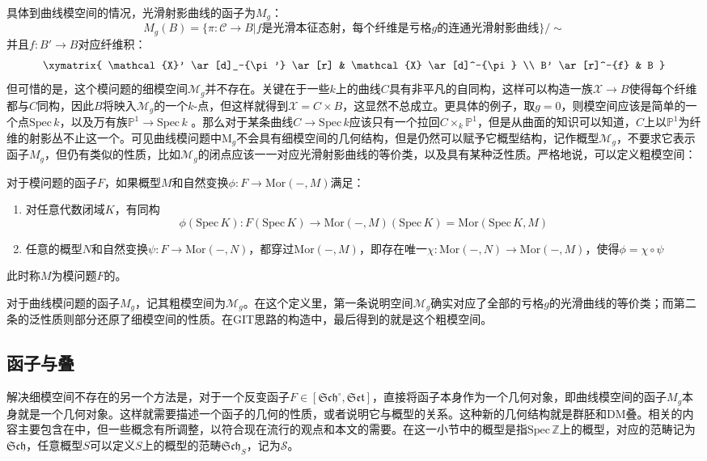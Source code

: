 具体到曲线模空间的情况，光滑射影曲线的函子为$ M_g $：
$$  M_g (B)=\{\pi:\mathcal{C} \to B| f \text{是光滑本征态射，每个纤维是亏格} g \text{的连通光滑射影曲线}  \} / \sim $$
并且$ f:B'\to B $对应纤维积：
$$ \xymatrix{
	\mathcal{X}' \ar[d]_-{\pi'} \ar[r] & \mathcal{X} \ar[d]^-{\pi} \\
	B' \ar[r]^-{f} & B
} $$
但可惜的是，这个模问题的细模空间$ \mathcal{M}_g $并不存在。关键在于一些$ k $上的曲线$ C$具有非平凡的自同构，这样可以构造一族$ \mathcal{X}\to B $使得每个纤维都与$ C $同构，因此$ B $将映入$ \mathcal{M}_g $的一个$ k $-点，但这样就得到$ \mathcal{X}=C\times B $，这显然不总成立。更具体的例子，取$ g=0 $，则模空间应该是简单的一个点$ \mathrm{Spec}\,k $，以及万有族$ \mathbb{P}^1 \to \mathrm{Spec}\,k$
。那么对于某条曲线$ C \to \mathrm{Spec}\,k $应该只有一个拉回$ C\times_k\mathbb{P}^1 $，但是从曲面的知识可以知道，$ C $上以$ \mathbb{P}^1 $为纤维的射影丛不止这一个。可见曲线模问题中$ \mathrm{M}_g $不会具有细模空间的几何结构，但是仍然可以赋予它概型结构，记作概型$ \mathcal{M}_g $，不要求它表示函子$ M_g $，但仍有类似的性质，比如$ \mathcal{M}_g $的闭点应该一一对应光滑射影曲线的等价类，以及具有某种泛性质。严格地说，可以定义粗模空间：
\begin{definition}
	对于模问题的函子$ F $，如果概型$ M $和自然变换$ \phi:F \to \mathrm{Mor}(-,M) $满足：
	\begin{enumerate}
		\item 对任意代数闭域$ K $，有同构$$ \phi(\mathrm{Spec}\,K):F(\mathrm{Spec}\,K) \to  \mathrm{Mor}(-,M)(\mathrm{Spec}\,K)=\mathrm{Mor}(\mathrm{Spec}\,K,M) $$
		\item 任意的概型$ N $和自然变换$ \psi :F \to \mathrm{Mor}(-,N) $，都穿过$ \mathrm{Mor}(-,M) $，即存在唯一$ \chi: \mathrm{Mor}(-,N)\to \mathrm{Mor}(-,M) $，使得$ \phi=\chi \circ \psi $
	\end{enumerate}
	此时称$ M $为模问题$ F $的。
\end{definition}

对于曲线模问题的函子$ M_g $，记其粗模空间为$ \mathcal{M}_g $。在这个定义里，第一条说明空间$ \mathcal{M}_g $确实对应了全部的亏格$ g $的光滑曲线的等价类；而第二条的泛性质则部分还原了细模空间的性质。在GIT思路的构造中，最后得到的就是这个粗模空间。

\subsection{函子与叠}\label{stack}
解决细模空间不存在的另一个方法是，对于一个反变函子$ F\in [\mathfrak{Sch}^\circ,\mathfrak{Set}] $，直接将函子本身作为一个几何对象，即曲线模空间的函子$ M_g $本身就是一个几何对象。这样就需要描述一个函子的几何的性质，或者说明它与概型的关系。这种新的几何结构就是群胚和DM叠。相关的内容主要包含在\cite{DM69,NotesModuliSpaceofCurves}中，但一些概念有所调整，以符合现在流行的观点和本文的需要。在这一小节中的概型是指$ \mathrm{Spec}\,\mathbb{Z} $上的概型，对应的范畴记为$ \mathfrak{Sch} $，任意概型$ S $可以定义$ S $上的概型的范畴$ \mathfrak{Sch}_S $，记为$ \mathscr{S} $。

